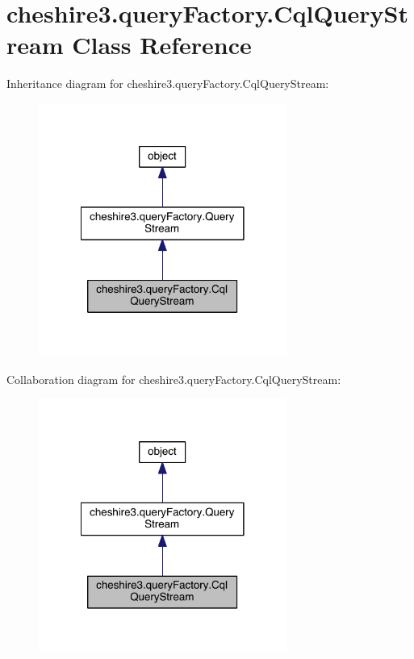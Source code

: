 \hypertarget{classcheshire3_1_1query_factory_1_1_cql_query_stream}{\section{cheshire3.\-query\-Factory.\-Cql\-Query\-Stream Class Reference}
\label{classcheshire3_1_1query_factory_1_1_cql_query_stream}
}


Inheritance diagram for cheshire3.\-query\-Factory.\-Cql\-Query\-Stream\-:
\nopagebreak
\begin{figure}[H]
\begin{center}
\leavevmode
\includegraphics[width=230pt]{classcheshire3_1_1query_factory_1_1_cql_query_stream__inherit__graph}
\end{center}
\end{figure}


Collaboration diagram for cheshire3.\-query\-Factory.\-Cql\-Query\-Stream\-:
\nopagebreak
\begin{figure}[H]
\begin{center}
\leavevmode
\includegraphics[width=230pt]{classcheshire3_1_1query_factory_1_1_cql_query_stream__coll__graph}
\end{center}
\end{figure}
